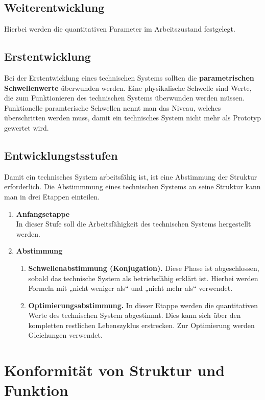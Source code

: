 \documentclass[11pt,a4paper]{article}
\begin{document}
\subsection{Weiterentwicklung}

Hierbei werden die quantitativen Parameter im Arbeitszustand festgelegt.

\subsection{Erstentwicklung}

Bei der Erstentwicklung eines technischen Systems sollten die
\textbf{parametrischen Schwellenwerte} überwunden werden.  Eine physikalische
Schwelle sind Werte, die zum Funktionieren des technischen Systems überwunden
werden müssen.  Funktionelle paramterische Schwellen nennt man das Niveau,
welches überschritten werden muss, damit ein technisches System nicht mehr als
Prototyp gewertet wird.

\subsection{Entwicklungstsstufen}

Damit ein technisches System arbeitsfähig ist, ist eine Abstimmung der
Struktur erforderlich.  Die Abstimmmung eines technischen Systems an seine
Struktur kann man in drei Etappen einteilen.

\begin{enumerate}
\item \textbf{Anfangsetappe}\\ In dieser Stufe soll die Arbeitsfähigkeit des
  technischen Systems hergestellt werden.
\item \textbf{Abstimmung}
\begin{enumerate}
\item \textbf{Schwellenabstimmung (Konjugation).} Diese Phase ist
  abgeschlossen, sobald das technische System als betriebsfähig erklärt
  ist. Hierbei werden Formeln mit „nicht weniger als“ und „nicht mehr als“
  verwendet.
\item \textbf{Optimierungsabstimmung.} In dieser Etappe werden die
  quantitativen Werte des technischen System abgestimmt. Dies kann sich über
  den kompletten restlichen Lebenszyklus erstrecken. Zur Optimierung werden
  Gleichungen verwendet.
\end{enumerate}
\end{enumerate}

\section{Konformität von Struktur und Funktion}
\end{document}
